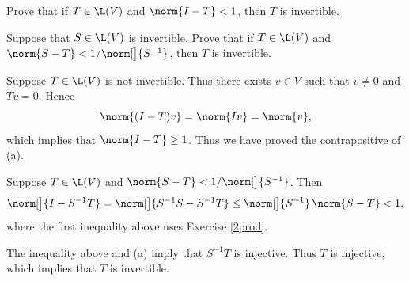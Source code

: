 \exercise
\begin{subtheorem}
\item
Prove that if $T \in \L(V)$ and $\norm{I - T} < 1$, then $T$ is invertible.
\item
Suppose that $S \in \L(V)$ is invertible. Prove that if $T \in \L(V)$ and $\norm{S - T} < 1/\norm[\big]{S^{-1}}$, then $T$ is invertible.
\end{subtheorem}

\begin{Solution}
\begin{subtheorem}
\item
Suppose $T \in \L(V)$ is not invertible. Thus there exists $v \in V$ such that $v \ne 0$ and $Tv = 0$. Hence
\[
\norm{(I - T) v} = \norm{Iv} = \norm{v},
\]
which implies that $\norm{I - T} \ge 1$. Thus we have proved the contrapositive of (a).

\item
Suppose $T \in \L(V)$ and $\norm{S - T} < 1/\norm[\big]{S^{-1}}$. Then
\[
\norm[\big]{ I - S^{-1} T } = \norm[\big]{ S^{-1} S - S^{-1} T } \le \norm[\big]{ S^{-1} } \, \norm{S - T} < 1,
\]
where the first inequality above uses Exercise \ref{2prod}.

The inequality above and (a) imply that $S^{-1} T$ is injective. Thus $T$ is injective, which implies that $T$ is invertible.
\end{subtheorem}
\end{Solution}

